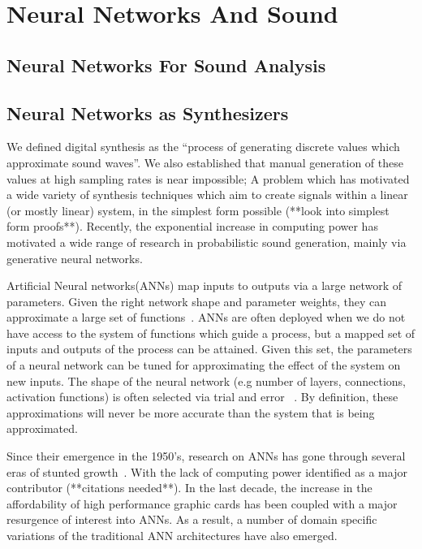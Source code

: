 \documentclass[\main/thesis.tex]{subfiles}
\begin{document}
\section{Neural Networks And Sound}
\label{bg:NN}
\subsection{Neural Networks For Sound Analysis}
\subsection{Neural Networks as Synthesizers}
We defined digital synthesis as the \enquote{process of generating discrete values which approximate sound waves}. We also established that manual generation of these values at high sampling rates is near impossible; A problem which has motivated a wide variety of synthesis techniques which aim to create signals within a linear (or mostly linear) system, in the simplest form possible (**look into simplest form proofs**). Recently, the exponential increase in computing power has motivated a wide range of research in probabilistic sound generation, mainly via generative neural networks. 

Artificial Neural networks(ANNs) map inputs to outputs via a large network of parameters. Given the right network shape and parameter weights, they can approximate a large set of functions~\cite{cybenko1989approximation,cardaliaguet1992approximation}. ANNs are often deployed when we do not have access to the system of functions which guide a process, but a mapped set of inputs and outputs of the process can be attained. Given this set, the parameters of a neural network can be tuned for approximating the effect of the system on new inputs. The shape of the neural network (e.g number of layers, connections, activation functions) is often selected via trial and error ~\cite{bergstra2012random,bergstra2011algorithms,ba2013adaptive}. By definition, these approximations will never be more accurate than the system that is being approximated. 

Since their emergence in the 1950's, research on ANNs has gone through several eras of stunted growth~\cite{basheer2000artificial,anderson1988neurocomputing}. With the lack of computing power identified as a major contributor (**citations needed**). In the last decade, the increase in the affordability of high performance graphic cards has been coupled with a major resurgence of interest into ANNs. As a result, a number of domain specific variations of the traditional ANN architectures have also emerged. 
\end{document}
